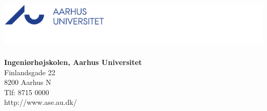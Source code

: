 

{}
\thispagestyle{empty}

\begin{minipage}[t]{0.48\textwidth}
\vspace*{-8pt}			
\includegraphics[height=2.5cm]{Kravspecifikation/Illustrationer/AU-logo-DK}
\end{minipage}
\hfill
\begin{minipage}[t]{0.48\textwidth}
{\small 
\textbf{Ingeniørhøjskolen, Aarhus Universitet}\\
Finlandsgade 22 \\
8200 Aarhus N \\
Tlf: 8715 0000 \\
http://www.ase.au.dk/}
\end{minipage}

\vspace*{1cm}

